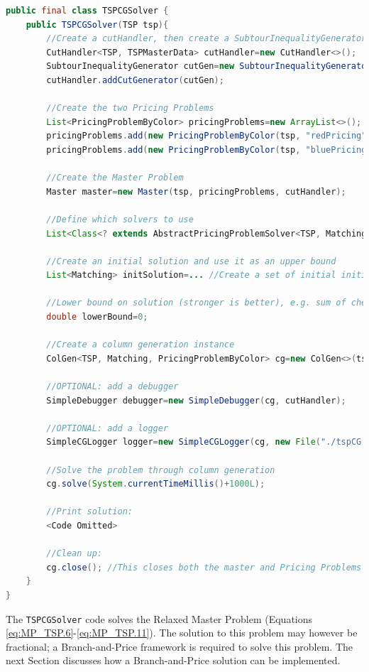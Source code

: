 \documentclass[a4paper]{article}
\newenvironment{myblock}[1]{%
    \tcolorbox[beamer,%
    noparskip,breakable,
    colback=lightBlueCodeBlock,colframe=darkBlueCodeBlock,%
    colbacklower=darkBlueCodeBlock!75!lightBlueCodeBlock,%
    coltitle=blueTitleCodeBlock,
    title=#1]}%
    {\endtcolorbox}
\newcommand{\code}[1]{\lstinline[language=java, style=seminar]!#1!}
\begin{document}
\begin{myblock}{TSPCGSolver}
\begin{lstlisting}[language=java, style=eclipseArticle, xleftmargin=2em]  
public final class TSPCGSolver {
	public TSPCGSolver(TSP tsp){
		//Create a cutHandler, then create a SubtourInequalityGenerator and add it to the handler
		CutHandler<TSP, TSPMasterData> cutHandler=new CutHandler<>();
		SubtourInequalityGenerator cutGen=new SubtourInequalityGenerator(tsp);
		cutHandler.addCutGenerator(cutGen);

		//Create the two Pricing Problems
		List<PricingProblemByColor> pricingProblems=new ArrayList<>();
		pricingProblems.add(new PricingProblemByColor(tsp, "redPricing", MatchingColor.RED));
		pricingProblems.add(new PricingProblemByColor(tsp, "bluePricing", MatchingColor.BLUE));

		//Create the Master Problem
		Master master=new Master(tsp, pricingProblems, cutHandler);
		
		//Define which solvers to use
		List<Class<? extends AbstractPricingProblemSolver<TSP, Matching, PricingProblemByColor>>> solvers= Collections.singletonList(ExactPricingProblemSolver.class);
		
		//Create an initial solution and use it as an upper bound
		List<Matching> initSolution=... //Create a set of initial initialColumns.

		//Lower bound on solution (stronger is better), e.g. sum of cheapest edge out of every node.
		double lowerBound=0;

		//Create a column generation instance
		ColGen<TSP, Matching, PricingProblemByColor> cg=new ColGen<>(tsp, master, pricingProblems, solvers, initSolution, tourLengthInitSolution, lowerBound);

		//OPTIONAL: add a debugger
		SimpleDebugger debugger=new SimpleDebugger(cg, cutHandler);

		//OPTIONAL: add a logger
		SimpleCGLogger logger=new SimpleCGLogger(cg, new File("./tspCG.log"));

		//Solve the problem through column generation
		cg.solve(System.currentTimeMillis()+1000L);

		//Print solution:
		<Code Omitted>

		//Clean up:
		cg.close(); //This closes both the master and Pricing Problems
	}
}
\end{lstlisting}
\end{myblock}
The \code{TSPCGSolver} code solves the Relaxed Master Problem (Equations \eqref{eq:MP_TSP.6}-\eqref{eq:MP_TSP.11}). The solution to this problem may however be fractional; a Branch-and-Price framework is required to solve this problem. The next Section discusses how a Branch-and-Price solution can be implemented.
\end{document}
